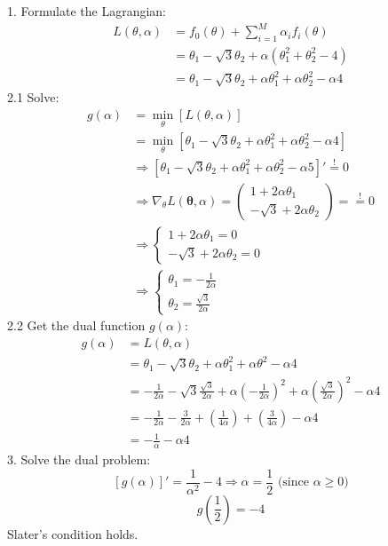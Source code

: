 \begin{flushleft}
1. Formulate the Lagrangian:
\begin{align*}
  L(\theta, \alpha) &= f_0(\theta) + \sum^M_{i=1} \alpha_i f_i(\theta) \\
  &= \theta_1 - \sqrt{3} \theta_2 + \alpha(\theta_1^2  + \theta_2^2 - 4) \\
  &= \theta_1 - \sqrt{3} \theta_2 + \alpha\theta_1^2 + \alpha\theta_2^2 - \alpha 4
\end{align*}
2.1 Solve:
\begin{align*}
  g(\alpha) &= \underset{\theta}{\min}\left[ L(\theta, \alpha)\right] \\
  &= \underset{\theta}{\min}\left[\theta_1 - \sqrt{3} \theta_2 + \alpha \theta_1^2 + \alpha \theta_2^2 - \alpha 4 \right] \\
  &\Rightarrow \left[ \theta_1 - \sqrt{3} \theta_2 + \alpha \theta_1^2 + \alpha \theta_2^2 - \alpha 5 \right]' \overset{!}{=} 0 \\
  &\Rightarrow \nabla_\theta L(\mathbf{\theta}, \alpha) =
  \begin{pmatrix}
    1 + 2 \alpha \theta_1 \\
    - \sqrt{3} + 2 \alpha \theta_2
  \end{pmatrix} = \overset{!}{=} 0 \\
  &\Rightarrow \begin{cases}
    1 + 2 \alpha \theta_1 = 0 \\
    -\sqrt{3} + 2 \alpha \theta_2 = 0
  \end{cases} \\
  &\Rightarrow \begin{cases}
    \theta_1 = -\frac{1}{2\alpha} \\
    \theta_2 = \frac{\sqrt{3}}{2 \alpha}
  \end{cases}
\end{align*}
2.2 Get the dual function $g(\alpha)$:
\begin{align*}
  g(\alpha) &= L(\theta, \alpha) \\
  &= \theta_1 - \sqrt{3} \theta_2 + \alpha \theta_1^2 + \alpha \theta^2 - \alpha 4 \\
  &= -\frac{1}{2 \alpha} - \sqrt{3} \frac{\sqrt{3}}{2 \alpha} + \alpha \left( -\frac{1}{2 \alpha} \right)^2 + \alpha \left( \frac{\sqrt{3}}{2 \alpha} \right)^2 - \alpha 4 \\
  &= -\frac{1}{2 \alpha} - \frac{3}{2 \alpha} + \left(\frac{1}{4 \alpha} \right) + \left(\frac{3}{4 \alpha} \right) - \alpha 4 \\
  &= - \frac{1}{\alpha} - \alpha 4 
\end{align*}
3. Solve the dual problem:
\[ 
\left[g(\alpha)\right]' = \frac{1}{\alpha^2} - 4 \Rightarrow \alpha = \frac{1}{2} \text{ (since $\alpha \geq 0$)}
\]
\[ 
g\left(\frac{1}{2}\right) = -4
\]
Slater's condition holds.
\end{flushleft}
